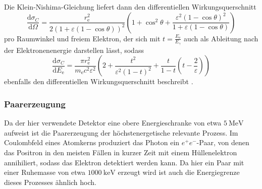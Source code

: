 Die Klein-Nishima-Gleichung liefert dann den differentiellen Wirkungsquerschnitt
\begin{equation}
    \frac{\text{d}\sigma_C}{\text{d}\Omega} = \frac{r_\text{e}^2}{2 (1 + \varepsilon (1 - \cos\theta))^2} 
                                              \left(1 + \cos^2\theta + \frac{\varepsilon^2 (1 - \cos\theta)^2}{1 + \varepsilon (1 - \cos\theta)} \right)
                                              \label{eq:dcrossomega}
\end{equation}
pro Raumwinkel und freiem Elektron, der sich mit $t = \frac{E_\text{e}}{E_\gamma}$ auch als Ableitung nach der Elektronenenergie darstellen lässt, sodass
\begin{equation}
    \frac{\text{d}\sigma_C}{\text{d}E_\text{e}} = \frac{\pi r^2_\text{e}}{m_\text{e} c^2 \varepsilon^2} 
                                                  \left(2 + \frac{t^2}{\varepsilon^2 (1-t)^2} + \frac{t}{1-t} \left(t - \frac{2}{\varepsilon}\right)\right)
    \label{dcrossE_e}
\end{equation}
ebenfalls den differentiellen Wirkungsquerschnitt beschreibt \cite{Teilchendetektoren}.

\subsubsection{Paarerzeugung}

Da der hier verwendete Detektor eine obere Energieschranke von etwa $\SI{5}{\mega\eV}$ aufweist ist die Paarerzeugung der höchstenergetische relevante Prozess.
Im Coulombfeld eines Atomkerns produziert das Photon ein $e^+ e^-$-Paar, von denen das Positron in den meisten Fällen in kurzer Zeit mit einem Hüllenelektron annihiliert,
sodass das Elektron detektiert werden kann.
Da hier ein Paar mit einer Ruhemasse von etwa $\SI{1000}{\kilo\eV}$ erzeugt wird ist auch die Energiegrenze dieses Prozesses ähnlich hoch.



